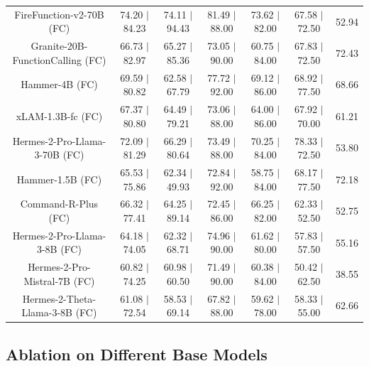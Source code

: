 \documentclass{article}
\begin{document}
\begin{table}[ht]
\begin{tabular}{c|ccccc|c}
FireFunction-v2-70B (FC) & 74.20 $|$ 84.23 & 74.11 $|$ 94.43 & 81.49 $|$ 88.00 & 73.62 $|$ 82.00 & 67.58 $|$ 72.50 & 52.94\\
Granite-20B-FunctionCalling (FC) & 66.73 $|$ 82.97 & 65.27 $|$ 85.36 & 73.05 $|$ 90.00 & 60.75 $|$ 84.00 & 67.83 $|$ 72.50 & 72.43\\
\rowcolor[HTML]{EFEFEF} Hammer-4B (FC) & 69.59 $|$ 80.82 & 62.58 $|$ 67.79 & 77.72 $|$ 92.00 & 69.12 $|$ 86.00 & 68.92 $|$ 77.50 & 68.66\\
xLAM-1.3B-fc (FC) & 67.37 $|$ 80.80 & 64.49 $|$ 79.21 & 73.06 $|$ 88.00 & 64.00 $|$ 86.00 & 67.92 $|$ 70.00 & 61.21\\
Hermes-2-Pro-Llama-3-70B (FC) & 72.09 $|$ 81.29 & 66.29 $|$ 80.64 & 73.49 $|$ 88.00 & 70.25 $|$ 84.00 & 78.33 $|$ 72.50 & 53.80\\
\rowcolor[HTML]{EFEFEF} Hammer-1.5B (FC) & 65.53 $|$ 75.86 & 62.34 $|$ 49.93 & 72.84 $|$ 92.00 & 58.75 $|$ 84.00 & 68.17 $|$ 77.50 & 72.18\\
Command-R-Plus (FC) & 66.32 $|$ 77.41 & 64.25 $|$ 89.14 & 72.45 $|$ 86.00 & 66.25 $|$ 82.00 & 62.33 $|$ 52.50 & 52.75\\
Hermes-2-Pro-Llama-3-8B (FC) & 64.18 $|$ 74.05 & 62.32 $|$ 68.71 & 74.96 $|$ 90.00 & 61.62 $|$ 80.00 & 57.83 $|$ 57.50 & 55.16\\
Hermes-2-Pro-Mistral-7B (FC) & 60.82 $|$ 74.25 & 60.98 $|$ 60.50 & 71.49 $|$ 90.00 & 60.38 $|$ 84.00 & 50.42 $|$ 62.50 & 38.55\\
Hermes-2-Theta-Llama-3-8B (FC) & 61.08 $|$ 72.54 & 58.53 $|$ 69.14 & 67.82 $|$ 88.00 & 59.62 $|$ 78.00 & 58.33 $|$ 55.00 & 62.66\\
\bottomrule
\end{tabular}
\end{table}

\subsection{Ablation on Different Base Models} 
\end{document}
